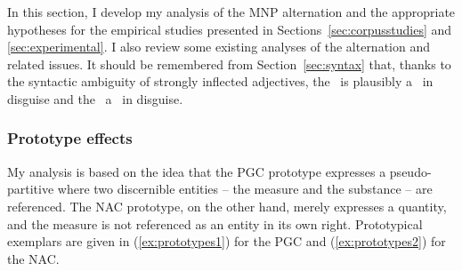 In this section, I develop my analysis of the MNP alternation and the appropriate hypotheses for the empirical studies presented in Sections~\ref{sec:corpusstudies} and \ref{sec:experimental}.
I also review some existing analyses of the alternation and related issues.
It should be remembered from Section~\ref{sec:syntax} that, thanks to the syntactic ambiguity of strongly inflected adjectives, the \PGCa\ is plausibly a \PGCd\ in disguise and the \NACa\ a \NACb\ in disguise.

\subsubsection{Prototype effects}
\label{sec:prototypeeffects}

My analysis is based on the idea that the PGC prototype expresses a pseudo-partitive where two discernible entities -- the measure and the substance -- are referenced.
The NAC prototype, on the other hand, merely expresses a quantity, and the measure is not referenced as an entity in its own right.
Prototypical exemplars are given in (\ref{ex:prototypes1}) for the PGC and (\ref{ex:prototypes2}) for the NAC.

\begin{exe}
  \ex\label{ex:prototypes} 
  \begin{xlist}
  \end{xlist}
\end{exe}

